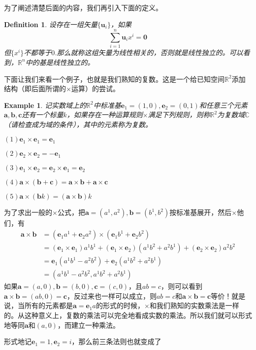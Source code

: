 \documentclass[11pt,a4paper,openany]{book}%
\theoremstyle{plain}%
\newtheorem{defi}{Definition}[chapter]%
\newtheorem{exa}{Example}[chapter]%
\newcommand{\NO}[1]{{$(#1)$}}%
\begin{document}
为了阐述清楚后面的内容，我们再引入下面的定义。
\begin{defi}
设存在一组矢量$\{\bm{u}_{i}\}$，如果
\[
\sum_{i=1}^{n}\bm{u}_{i}x^{i}=\bm{0}
\]
但$\{x^{i}\}$不都等于$0$.那么就称这组矢量为{\kaishu 线性相关}的，否则就是{\kaishu 线性独立}的。可以看到，$\mathbb{R}^{n}$中的基是线性独立的。
\end{defi}
\label{a18}
\indent 下面让我们来看一个例子，也就是我们熟知的复数。这是一个给已知空间$\mathbb{R}^{2}$添加结构（即后面所谓的$\times$运算）的尝试。
\begin{exa}
记实数域上的$\mathbb{R}^{2}$中标准基$\bm{e}_{1}=(1,0),\bm{e}_{2}=(0,1)$和任意三个元素$\bm{a},\bm{b},\bm{c}$还有一个标量$k$，如果存在一种运算规则$\times$满足下列规则，则称$\mathbb{R}^{2}$为复数域$\mathbb{C}$（请检查成为域的条件），其中的元素称为复数。

\NO{1}$\bm{e}_{1}\times \bm{e}_{1}=\bm{e}_{1}$

\NO{2}$\bm{e}_{2}\times \bm{e}_{2}=-\bm{e}_{1}$

\NO{3}$\bm{e}_{1}\times \bm{e}_{2}=\bm{e}_{2}\times \bm{e}_{1}=\bm{e}_{2}$

\NO{4}$\bm{a}\times(\bm{b}+\bm{c})=\bm{a}\times \bm{b}+\bm{a}\times \bm{c}$

\NO{5}$\bm{a}\times(\bm{b}k)=(\bm{a}\times \bm{b})k$
\end{exa}

\indent 为了求出一般的$\times$公式，把$\bm{a}=(a^1,a^2),\bm{b}=(b^1,b^2)$按标准基展开，然后$\times$他们，有
\begin{equation*}
\begin{split}
\bm{a}\times \bm{b}&=(\bm{e}_{1}a^1+\bm{e}_{2}a^2)\times (\bm{e}_{1}b^1+\bm{e}_{2}b^2)\\
&=(\bm{e}_{1}\times \bm{e}_{1})a^1b^1+(\bm{e}_{1}\times \bm{e}_{2})(a^1b^2+a^2b^1)+(\bm{e}_{2}\times \bm{e}_{2})a^2b^2\\
&=\bm{e}_{1}(a^1b^1-a^2b^2)+\bm{e}_{2}(a^1b^2+a^2b^1)\\
&=(a^1b^1-a^2b^2,a^1b^2+a^2b^1)
\end{split}
\end{equation*}
\indent 如果$\bm{a}=(a,0),\bm{b}=(b,0),\bm{c}=(c,0)$，且$ab=c$，则可以看到$\bm{a}\times \bm{b}=(ab,0)=\bm{c}$，反过来也一样可以成立，则$ab=c$和$\bm{a}\times \bm{b}=\bm{c}$等价！就是说，当所有的元素都是$\bm{a}=\bm{e}_{1}a$的形式的时候，$\times$和我们熟知的实数乘法是一样的。从这种意义上，复数的乘法可以完全地看成实数的乘法。所以我们就可以形式地等同$\bm{a}$和$(a,0)$，而建立一种乘法。

形式地记$\bm{e}_{1}=1,\bm{e}_{2}=i$，那么前三条法则也就变成了
\end{document}
